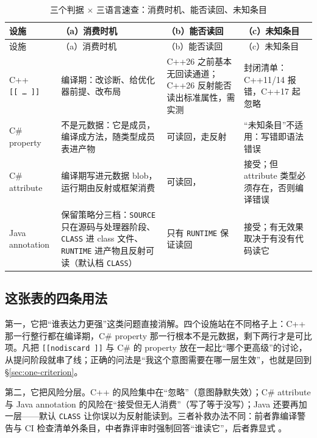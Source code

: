 \documentclass[12pt,a4paper,fontset=fandol]{ctexbook}
\newcommand{\cpp}[1]{C++#1}
\newcommand{\kw}[1]{\texttt{#1}}
\newcommand{\seqkw}[1]{\seqsplit{\texttt{#1}}}
\begin{document}
{\footnotesize
\begin{longtable}{@{}>{\raggedright\arraybackslash}p{}>{\raggedright\arraybackslash}p{}>{\raggedright\arraybackslash}p{}>{\raggedright\arraybackslash}p{}@{}}
\caption{三个判据 $\times$ 三语言速查：消费时机、能否读回、未知条目}\label{tab:ch1-criteria}\\
\toprule
设施 & （a）消费时机 & （b）能否读回 & （c）未知条目 \\ \midrule
\endfirsthead
\toprule
设施 & （a）消费时机 & （b）能否读回 & （c）未知条目 \\ \midrule
\endhead
\bottomrule
\endfoot
\cpp{} \texttt{[[\,\dots\,]]} & 编译期：改诊断、给优化器前提、改布局 & \cpp{26} 之前基本无回读通道；\cpp{26} 反射能否读出标准属性，需实测 & 封闭清单：\cpp{11}/14 报错，\cpp{17} 起忽略 \\
C\# property & 不是元数据：它是成员，编译成方法，随类型成员表进产物 & 可读回，走反射 \seqkw{GetProperty} & “未知条目”不适用：写错即语法错误 \\
C\# attribute & 编译期写进元数据 blob，运行期由反射或框架消费 & 可读回，\seqkw{GetCustomAttributes} & 接受；但 attribute 类型必须存在，否则编译错误 \\
Java annotation & 保留策略分三档：\texttt{SOURCE} 只在源码与处理器阶段、\texttt{CLASS} 进 class 文件、\texttt{RUNTIME} 进产物且反射可读（默认档 \texttt{CLASS}） & 只有 \texttt{RUNTIME} 保证读回 & 接受；有无效果取决于有没有代码读它 \\
\end{longtable}
}

\subsection*{这张表的四条用法}

第一，它把“谁表达力更强”这类问题直接消解。四个设施站在不同格子上：\cpp{} 那一行整行都在编译期，C\# property 那一行根本不是元数据，剩下两行才是可比项。凡把 \kw{[[nodiscard\,]]} 与 C\# 的 property 放在一起比“哪个更高级”的讨论，从提问阶段就串了线；正确的问法是“我这个意图需要在哪一层生效”，也就是回到 \S\ref{sec:one-criterion}。

第二，它把风险分层。\cpp{} 的风险集中在“忽略”（意图静默失效）；C\# attribute 与 Java annotation 的风险在“接受但无人消费”（写了等于没写）；Java 还要再加一层——默认 \texttt{CLASS} 让你误以为反射能读到。三者补救办法不同：前者靠编译警告与 CI 检查清单外条目，中者靠评审时强制回答“谁读它”，后者靠显式 \seqkw{@Retention}。
\end{document}
